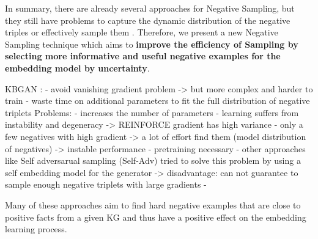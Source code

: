 In summary, there are already several approaches for Negative Sampling, but they still have problems to capture the dynamic distribution of the negative triples or effectively sample them \cite{zhang2021efficient}.
Therefore, we present a new Negative Sampling technique which aims to \textbf{improve the efficiency of Sampling by selecting more informative and useful negative examples for the embedding model by uncertainty}.












KBGAN
\cite{zhang2021efficient}:
- avoid vanishing gradient problem 
-> but more complex and harder to train
- waste time on additional parameters to fit the full distribution of negative triplets
Problems: - increases the number of parameters
- learning suffers from instability and degeneracy
-> REINFORCE gradient has high variance
- only a few negatives with high gradient -> a lot of effort find them (model distribution of negatives)
-> instable performance
- pretraining necessary
- other approaches like Self adversarual sampling (Self-Adv) tried to solve this problem by using a self embedding model for the generator
-> disadvantage: can not guarantee to sample enough negative triplets with large gradients 
- %



Many of these approaches aim to find hard negative examples that are close to positive facts from a given \ac{KG} and thus have a positive effect on the embedding learning process.



